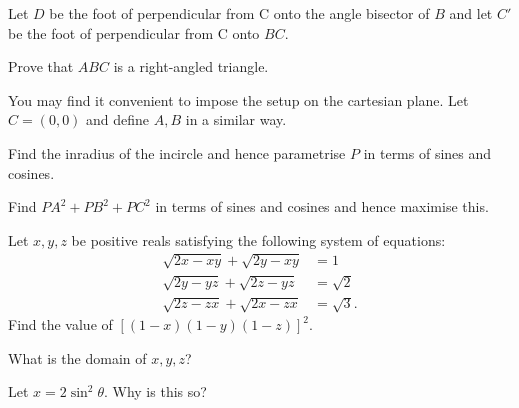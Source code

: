 \documentclass[../jarvis.tex]{subfiles}
\begin{document}
\begin{hints}
    \begin{hint}
        Let $D$ be the foot of perpendicular from C onto the angle bisector of $B$ and let $C'$ be the foot of perpendicular from C onto $BC$.
    \end{hint}
    \begin{hint}
        Prove that $ABC$ is a right-angled triangle.
    \end{hint}
    \begin{hint}
        You may find it convenient to impose the setup on the cartesian plane. Let $C=(0,0)$ and define $A,B$ in a similar way.
    \end{hint}
    \begin{hint}
        Find the inradius of the incircle and hence parametrise $P$ in terms of sines and cosines.
    \end{hint}
    \begin{hint}
        Find $PA^2+PB^2+PC^2$ in terms of sines and cosines and hence maximise this.
    \end{hint}
\end{hints}
\problem[2022 AIME I/15] Let $x,y,z$ be positive reals satisfying the following system of equations:
\begin{align*}
    \sqrt{2x-xy}+\sqrt{2y-xy}&=1 \\
    \sqrt{2y-yz}+\sqrt{2z-yz}&=\sqrt{2} \\
    \sqrt{2z-zx}+\sqrt{2x-zx}&=\sqrt{3}.
\end{align*}
Find the value of $[(1-x)(1-y)(1-z)]^2.$\begin{hints}
    \begin{hint}
        What is the domain of $x,y,z$?
    \end{hint}
    \begin{hint}
        Let $x=2\sin^2{\theta}$. Why is this so?
    \end{hint}
\end{hints}
\end{document}
